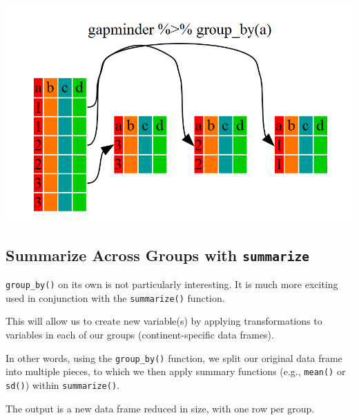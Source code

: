 \documentclass[]{book}
\newenvironment{Shaded}{\begin{snugshade}}{\end{snugshade}}
\newcommand{\KeywordTok}[1]{\textcolor[rgb]{0.13,0.29,0.53}{\textbf{#1}}}
\newcommand{\DataTypeTok}[1]{\textcolor[rgb]{0.13,0.29,0.53}{#1}}
\newcommand{\StringTok}[1]{\textcolor[rgb]{0.31,0.60,0.02}{#1}}
\newcommand{\CommentTok}[1]{\textcolor[rgb]{0.56,0.35,0.01}{\textit{#1}}}
\newcommand{\OperatorTok}[1]{\textcolor[rgb]{0.81,0.36,0.00}{\textbf{#1}}}
\newcommand{\NormalTok}[1]{#1}
\begin{document}
\begin{center}\includegraphics[width=0.7\linewidth]{img/dplyr-fig2} \end{center}

\subsection{\texorpdfstring{Summarize Across Groups with
\texttt{summarize}}{Summarize Across Groups with summarize}}\label{summarize-across-groups-with-summarize}

\texttt{group\_by()} on its own is not particularly interesting. It is
much more exciting used in conjunction with the \texttt{summarize()}
function.

This will allow us to create new variable(s) by applying transformations
to variables in each of our groups (continent-specific data frames).

In other words, using the \texttt{group\_by()} function, we split our
original data frame into multiple pieces, to which we then apply summary
functions (e.g., \texttt{mean()} or \texttt{sd()}) within
\texttt{summarize()}.

The output is a new data frame reduced in size, with one row per group.

\begin{Shaded}
\end{Shaded}
\end{document}
